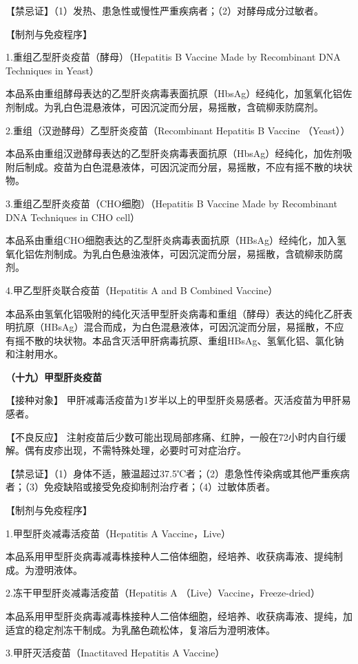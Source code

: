 【禁忌证】（1）发热、患急性或慢性严重疾病者；（2）对酵母成分过敏者。

【制剂与免疫程序】

1.重组乙型肝炎疫苗（酵母）（Hepatitis B Vaccine Made by Recombinant DNA
Techniques in Yeast）

本品系由重组酵母表达的乙型肝炎病毒表面抗原（HbsAg）经纯化，加氢氧化铝佐剂制成。为乳白色混悬液体，可因沉淀而分层，易摇散，含硫柳汞防腐剂。

2.重组（汉逊酵母）乙型肝炎疫苗（Recombinant Hepatitis B Vaccine
（Yeast））

本品系由重组汉逊酵母表达的乙型肝炎病毒表面抗原（HbsAg）经纯化，加佐剂吸附后制成。疫苗为白色混悬液体，可因沉淀而分层，易摇散，不应有摇不散的块状物。

3.重组乙型肝炎疫苗（CHO细胞）（Hepatitis B Vaccine Made by Recombinant
DNA Techniques in CHO cell）

本品系由重组CHO细胞表达的乙型肝炎病毒表面抗原（HBsAg）经纯化，加入氢氧化铝佐剂制成。为乳白色悬浊液体，可因沉淀而分层，易摇散，含硫柳汞防腐剂。

4.甲乙型肝炎联合疫苗（Hepatitis A and B Combined Vaccine）

本品系由氢氧化铝吸附的纯化灭活甲型肝炎病毒和重组（酵母）表达的纯化乙肝表明抗原（HBsAg）混合而成，为白色混悬液体，可因沉淀而分层，易摇散，不应有摇不散的块状物。本品含灭活甲肝病毒抗原、重组HBsAg、氢氧化铝、氯化钠和注射用水。

\textbf{（十九）甲型肝炎疫苗}

【接种对象】
甲肝减毒活疫苗为1岁半以上的甲型肝炎易感者。灭活疫苗为甲肝易感者。

【不良反应】
注射疫苗后少数可能出现局部疼痛、红肿，一般在72小时内自行缓解。偶有皮疹出现，不需特殊处理，必要时可对症治疗。

【禁忌证】（1）身体不适，腋温超过37.5℃者；（2）患急性传染病或其他严重疾病者；（3）免疫缺陷或接受免疫抑制剂治疗者；（4）过敏体质者。

【制剂与免疫程序】

1.甲型肝炎减毒活疫苗（Hepatitis A Vaccine，Live）

本品系用甲型肝炎病毒减毒株接种人二倍体细胞，经培养、收获病毒液、提纯制成。为澄明液体。

2.冻干甲型肝炎减毒活疫苗（Hepatitis A （Live）Vaccine，Freeze-dried）

本品系用甲型肝炎病毒减毒株接种人二倍体细胞，经培养、收获病毒液、提纯，加适宜的稳定剂冻干制成。为乳酪色疏松体，复溶后为澄明液体。

3.甲肝灭活疫苗（Inactitaved Hepatitis A Vaccine）

